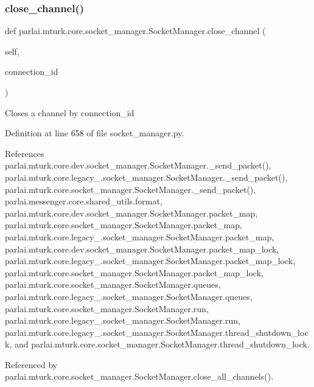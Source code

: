 \subsubsection{\texorpdfstring{close\+\_\+channel()}{close\_channel()}}
{\footnotesize\ttfamily def parlai.\+mturk.\+core.\+socket\+\_\+manager.\+Socket\+Manager.\+close\+\_\+channel (\begin{DoxyParamCaption}\item[{}]{self,  }\item[{}]{connection\+\_\+id }\end{DoxyParamCaption})}

\begin{DoxyVerb}Closes a channel by connection_id\end{DoxyVerb}
 

Definition at line 658 of file socket\+\_\+manager.\+py.



References parlai.\+mturk.\+core.\+dev.\+socket\+\_\+manager.\+Socket\+Manager.\+\_\+send\+\_\+packet(), parlai.\+mturk.\+core.\+legacy\+\_.\+socket\+\_\+manager.\+Socket\+Manager.\+\_\+send\+\_\+packet(), parlai.\+mturk.\+core.\+socket\+\_\+manager.\+Socket\+Manager.\+\_\+send\+\_\+packet(), parlai.\+messenger.\+core.\+shared\+\_\+utils.\+format, parlai.\+mturk.\+core.\+dev.\+socket\+\_\+manager.\+Socket\+Manager.\+packet\+\_\+map, parlai.\+mturk.\+core.\+socket\+\_\+manager.\+Socket\+Manager.\+packet\+\_\+map, parlai.\+mturk.\+core.\+legacy\+\_.\+socket\+\_\+manager.\+Socket\+Manager.\+packet\+\_\+map, parlai.\+mturk.\+core.\+dev.\+socket\+\_\+manager.\+Socket\+Manager.\+packet\+\_\+map\+\_\+lock, parlai.\+mturk.\+core.\+legacy\+\_.\+socket\+\_\+manager.\+Socket\+Manager.\+packet\+\_\+map\+\_\+lock, parlai.\+mturk.\+core.\+socket\+\_\+manager.\+Socket\+Manager.\+packet\+\_\+map\+\_\+lock, parlai.\+mturk.\+core.\+socket\+\_\+manager.\+Socket\+Manager.\+queues, parlai.\+mturk.\+core.\+legacy\+\_.\+socket\+\_\+manager.\+Socket\+Manager.\+queues, parlai.\+mturk.\+core.\+socket\+\_\+manager.\+Socket\+Manager.\+run, parlai.\+mturk.\+core.\+legacy\+\_.\+socket\+\_\+manager.\+Socket\+Manager.\+run, parlai.\+mturk.\+core.\+legacy\+\_.\+socket\+\_\+manager.\+Socket\+Manager.\+thread\+\_\+shutdown\+\_\+lock, and parlai.\+mturk.\+core.\+socket\+\_\+manager.\+Socket\+Manager.\+thread\+\_\+shutdown\+\_\+lock.



Referenced by parlai.\+mturk.\+core.\+socket\+\_\+manager.\+Socket\+Manager.\+close\+\_\+all\+\_\+channels().

